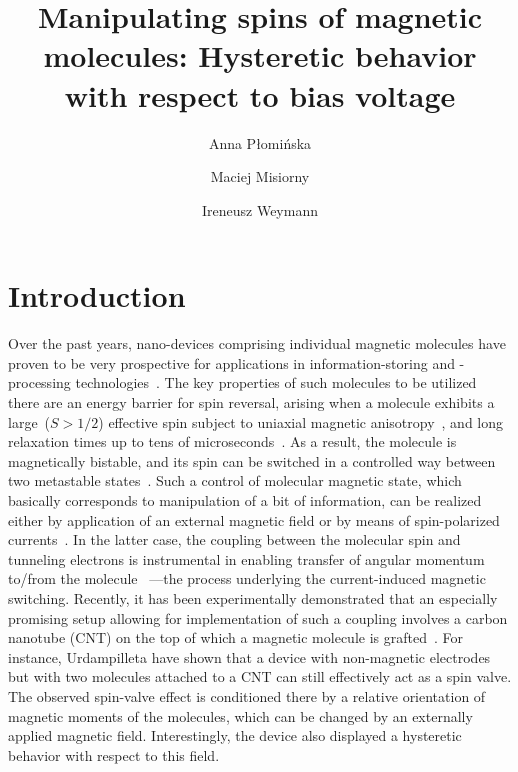 \documentclass[doublecol]{epl2} %
\title{Manipulating spins of magnetic molecules: Hysteretic behavior with respect to bias voltage}
\author{Anna P\l{}omi\'nska\inst{1} \and Maciej Misiorny\inst{2} \and Ireneusz Weymann\inst{1}}
\institute{
  \inst{1} Faculty of Physics, Adam Mickiewicz University, Pozna\'{n}, Poland\\
  \inst{2} Department of Microtechnology and Nanoscience MC2,
  Chalmers University of Technology, G\"{o}teborg, Sweden}
\begin{document}
\maketitle

\section{Introduction}
%
Over the past years, nano-devices comprising individual magnetic molecules have proven to be very prospective for applications in information-storing and -processing technologies~\cite{Bogani2008Mar,Bartolome_book}.
%
The key properties of such molecules to be utilized there are an energy barrier for spin reversal, arising when a molecule exhibits a large~(\mbox{$S>1/2$}) effective spin subject to uniaxial magnetic anisotropy~\cite{Gatteschi_book}, and long relaxation times up to tens of microseconds~\cite{Ardavan2007Jan,Bahr2008Feb,Takahashi2009Feb,Takahashi2011Aug}.
%
As a result, the molecule is magnetically bistable, and its spin can be switched in a controlled way between two metastable states~\cite{Mannini2009}. Such a control of molecular magnetic state, which basically corresponds to manipulation of a bit of information, can be realized either by application of an external magnetic field or by means of spin-polarized currents~\cite{Timm2006Jun,Misiorny2009Jun,Fransson2009Jun,Loth2010}.
%
In the latter case, the coupling between the molecular spin and tunneling electrons is instrumental in enabling transfer of angular momentum to/from the molecule~\cite{Misiorny2009Jun} ---the process underlying the current-induced magnetic switching.
%
Recently, it has been experimentally demonstrated that an especially promising setup allowing for implementation of such a coupling involves a carbon nanotube (CNT) on the top of which a magnetic molecule is grafted~\cite{Urdampilleta2011Jul,Ganzhorn2013Feb,Urdampilleta2015Apr}.
%
For instance, Urdampilleta \etal\cite{Urdampilleta2011Jul} have shown that a device with non-magnetic electrodes but with two molecules attached to a CNT can still effectively act as a spin valve. The observed spin-valve effect is conditioned there by a relative orientation of magnetic moments of the molecules, which can be changed by an externally applied magnetic field. Interestingly, the device also displayed a hysteretic behavior with respect to this field.
\end{document}
